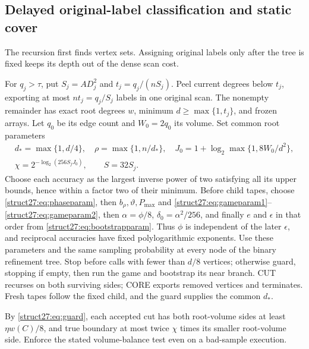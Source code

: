 \documentclass[11pt]{article}
\theoremstyle{remark}
\begin{document}
\subsection{Delayed original-label classification and static cover}

The recursion first finds vertex sets.
Assigning original labels only after the tree is fixed keeps its depth out of
the dense scan cost.

For $q_j>\tau$, put $S_j=AD_j^2$ and $t_j=q_j/(nS_j)$.
Peel current degrees below $t_j$, exporting at most $nt_j=q_j/S_j$ labels in one
original scan.
The nonempty remainder has exact root degrees $w$, minimum $d\ge\max\{1,t_j\}$,
and frozen arrays.
Let $q_0$ be its edge count and $W_0=2q_0$ its volume.
Set common root parameters
\begin{equation}\label{struct27:eq:phaseparam}
 \begin{gathered}
 d_* =\max\{1,d/4\},\quad\rho=\max\{1,n/d_*\},\quad
 J_0=1+ \log_2\max\{1,8W_0/d^2\} ,\\
 \chi=2^{- \log_2(256S_jJ_0) },\qquad S=32S_j.
 \end{gathered}
\end{equation}
Choose each accuracy as the largest inverse power of two satisfying all its
upper bounds, hence within a factor two of their minimum.
Before child tapes, choose \eqref{struct27:eq:phaseparam}, then
$b_\rho,\vartheta,P_{\max}$ and
\eqref{struct27:eq:gameparam1}--\eqref{struct27:eq:gameparam2}, then
$\alpha=\phi/8$, $\delta_0=\alpha^2/256$, and finally $e$ and $\epsilon$ in that
order from \eqref{struct27:eq:bootstrapparam}.
Thus $\phi$ is independent of the later $\epsilon$, and reciprocal accuracies
have fixed polylogarithmic exponents.
Use these parameters and the same sampling probability at every node of the
binary refinement tree.
Stop before calls with fewer than $d/8$ vertices; otherwise guard, stopping if
empty, then run the game and bootstrap its near branch.
CUT recurses on both surviving sides; CORE exports removed vertices and
terminates.
Fresh tapes follow the fixed child, and the guard supplies the common $d_*$.

By \eqref{struct27:eq:guard}, each accepted cut has both root-volume sides at
least $\eta w(C)/8$, and true boundary at most twice $\chi$ times its smaller
root-volume side.
Enforce the stated volume-balance test even on a bad-sample execution.
\end{document}
